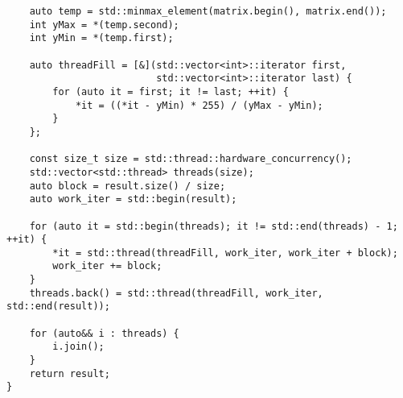 \documentclass{report}
\begin{document}
\begin{lstlisting}
    auto temp = std::minmax_element(matrix.begin(), matrix.end());
    int yMax = *(temp.second);
    int yMin = *(temp.first);

    auto threadFill = [&](std::vector<int>::iterator first,
                          std::vector<int>::iterator last) {
        for (auto it = first; it != last; ++it) {
            *it = ((*it - yMin) * 255) / (yMax - yMin);
        }
    };

    const size_t size = std::thread::hardware_concurrency();
    std::vector<std::thread> threads(size);
    auto block = result.size() / size;
    auto work_iter = std::begin(result);

    for (auto it = std::begin(threads); it != std::end(threads) - 1; ++it) {
        *it = std::thread(threadFill, work_iter, work_iter + block);
        work_iter += block;
    }
    threads.back() = std::thread(threadFill, work_iter, std::end(result));

    for (auto&& i : threads) {
        i.join();
    }
    return result;
}

\end{lstlisting}
\newpage
\end{document}
